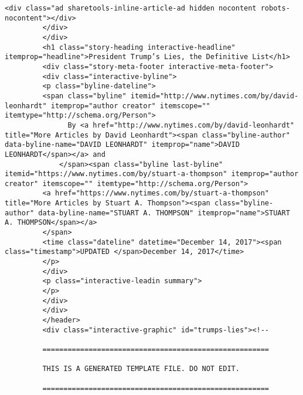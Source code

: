 \documentclass[11pt]{article}
\begin{document}
\begin{Verbatim}[commandchars=\\\{\}]
         <div class="ad sharetools-inline-article-ad hidden nocontent robots-nocontent"></div>
         </div>
         </div>
         <h1 class="story-heading interactive-headline" itemprop="headline">President Trump’s Lies, the Definitive List</h1>
         <div class="story-meta-footer interactive-meta-footer">
         <div class="interactive-byline">
         <p class="byline-dateline">
         <span class="byline" itemid="http://www.nytimes.com/by/david-leonhardt" itemprop="author creator" itemscope="" itemtype="http://schema.org/Person">
               By <a href="http://www.nytimes.com/by/david-leonhardt" title="More Articles by David Leonhardt"><span class="byline-author" data-byline-name="DAVID LEONHARDT" itemprop="name">DAVID LEONHARDT</span></a> and 
             </span><span class="byline last-byline" itemid="https://www.nytimes.com/by/stuart-a-thompson" itemprop="author creator" itemscope="" itemtype="http://schema.org/Person">
         <a href="https://www.nytimes.com/by/stuart-a-thompson" title="More Articles by Stuart A. Thompson"><span class="byline-author" data-byline-name="STUART A. THOMPSON" itemprop="name">STUART A. THOMPSON</span></a>
         </span>
         <time class="dateline" datetime="December 14, 2017"><span class="timestamp">UPDATED </span>December 14, 2017</time>
         </p>
         </div>
         <p class="interactive-leadin summary">
         </p>
         </div>
         </div>
         </header>
         <div class="interactive-graphic" id="trumps-lies"><!--
         
         ======================================================
         
         THIS IS A GENERATED TEMPLATE FILE. DO NOT EDIT.
         
         ======================================================
         

\end{Verbatim}
\end{document}
